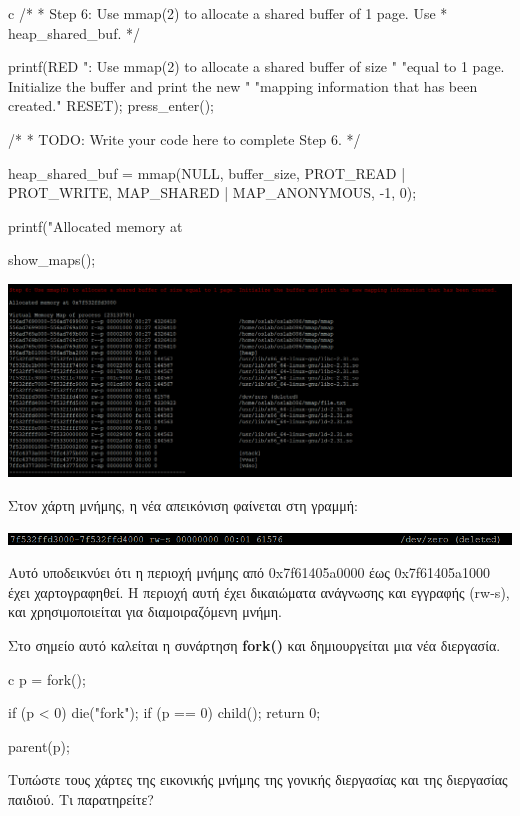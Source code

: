 \documentclass[12pt]{article}
\begin{document}
\begin{codeless}{c}
    /*
    * Step 6: Use mmap(2) to allocate a shared buffer of 1 page. Use
    * heap_shared_buf.
    */

   printf(RED ": Use mmap(2) to allocate a shared buffer of size "
       "equal to 1 page. Initialize the buffer and print the new "
       "mapping information that has been created.\n" RESET);
   press_enter();

   /*
    * TODO: Write your code here to complete Step 6.
    */
   
   heap_shared_buf = mmap(NULL, buffer_size, PROT_READ | PROT_WRITE, MAP_SHARED | MAP_ANONYMOUS, -1, 0);

   printf("Allocated memory at %

   show_maps();
\end{codeless}

\centerline{\includegraphics[width=1\textwidth]{3_1_6.png}}

Στον χάρτη μνήμης, η νέα απεικόνιση φαίνεται στη γραμμή:

\centerline{\includegraphics[width=1\textwidth]{3_1_6_ShB.png}}

Αυτό υποδεικνύει ότι η περιοχή μνήμης από 0x7f61405a0000 έως 0x7f61405a1000 έχει χαρτογραφηθεί. 
Η περιοχή αυτή έχει δικαιώματα ανάγνωσης και εγγραφής (rw-s), και χρησιμοποιείται για διαμοιραζόμενη μνήμη.

Στο σημείο αυτό καλείται η συνάρτηση \textbf{fork()} και δημιουργείται μια νέα διεργασία.

\begin{codeless}{c}
	p = fork();
	
	if (p < 0)
	{
		die("fork");
	}
	if (p == 0) 
	{
		child();
		return 0;
	}

	parent(p);
\end{codeless}

\begin{question}
Τυπώστε τους χάρτες της εικονικής μνήμης της γονικής διεργασίας και της 
διεργασίας παιδιού. Τι παρατηρείτε?
\end{question}
\end{document}

